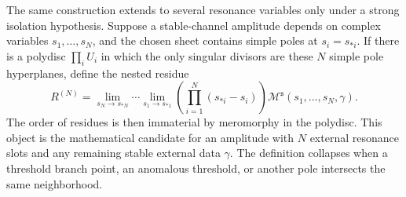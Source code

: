 The same construction extends to several resonance variables only under a
strong isolation hypothesis.  Suppose a stable-channel amplitude depends on
complex variables \(s_1,\ldots,s_N\), and the chosen sheet contains simple
poles at \(s_i=s_{\ast i}\).  If there is a polydisc
\(\prod_i U_i\) in which the only singular divisors are these \(N\) simple
pole hyperplanes, define the nested residue
\begin{equation}
  R^{(N)}
  =
  \lim_{s_N\to s_{\ast N}}\cdots
  \lim_{s_1\to s_{\ast1}}
  \left(\prod_{i=1}^N(s_{\ast i}-s_i)\right)
  \mathcal M^{\mathfrak s}(s_1,\ldots,s_N,\gamma).
  \label{eq:nested-resonance-residue}
\end{equation}
The order of residues is then immaterial by meromorphy in the polydisc.  This
object is the mathematical candidate for an amplitude with \(N\) external
resonance slots and any remaining stable external data \(\gamma\).  The
definition collapses when a threshold branch point, an anomalous threshold, or
another pole intersects the same neighborhood.

